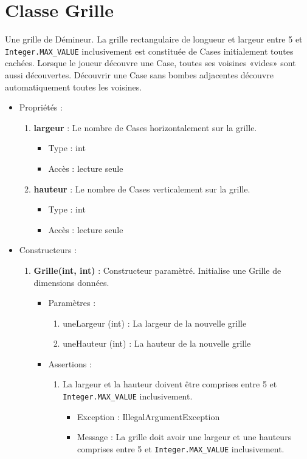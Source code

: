   \section {Classe Grille}

  Une grille de Démineur. La grille rectangulaire de longueur et largeur entre 5 et {\tt Integer.MAX_VALUE} inclusivement est constituée de Cases initialement toutes cachées. Lorsque le joueur découvre une Case, toutes ses voisines «vides» sont aussi découvertes. Découvrir une Case sans bombes adjacentes découvre automatiquement toutes les voisines.

  \begin{itemize}
  \item Propriétés : 
    \begin{enumerate}
    \item {\bf largeur} : Le nombre de Cases horizontalement sur la grille.
          \begin{itemize}
          \item Type : int
          \item Accès : lecture seule
          \end{itemize}
    \item {\bf hauteur} : Le nombre de Cases verticalement sur la grille.
          \begin{itemize}
          \item Type : int
          \item Accès : lecture seule
          \end{itemize}

    \end{enumerate}

  \item Constructeurs : 

  \begin{enumerate}
  \item {\bf Grille(int, int) }: Constructeur paramètré. Initialise une Grille de dimensions données.
    \begin{itemize}
    \item Paramètres : 
      \begin{enumerate}
      \item uneLargeur (int) : La largeur de la nouvelle grille
      \item uneHauteur (int) : La hauteur de la nouvelle grille
      \end{enumerate}
    \item Assertions : 
      \begin{enumerate}
      \item La largeur et la hauteur doivent être comprises entre 5 et {\tt Integer.MAX_VALUE} inclusivement.
        \begin{itemize}
          \item Exception : IllegalArgumentException
          \item Message : La grille doit avoir une largeur et une hauteurs comprises entre 5 et {\tt Integer.MAX_VALUE} inclusivement.
        \end{itemize}
      \end{enumerate}
      

\end{itemize}
\end{enumerate}
\end{itemize}

